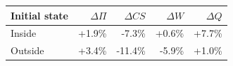 \begin{tabular}{lrrrr}\toprule
Initial state & $\Delta\Pi$ & $\Delta CS$ & $\Delta W$ & $\Delta Q$\\\midrule
Inside & +1.9\% & -7.3\% & +0.6\% & +7.7\% \\
Outside & +3.4\% & -11.4\% & -5.9\% & +1.0\% \\
\bottomrule\end{tabular}
